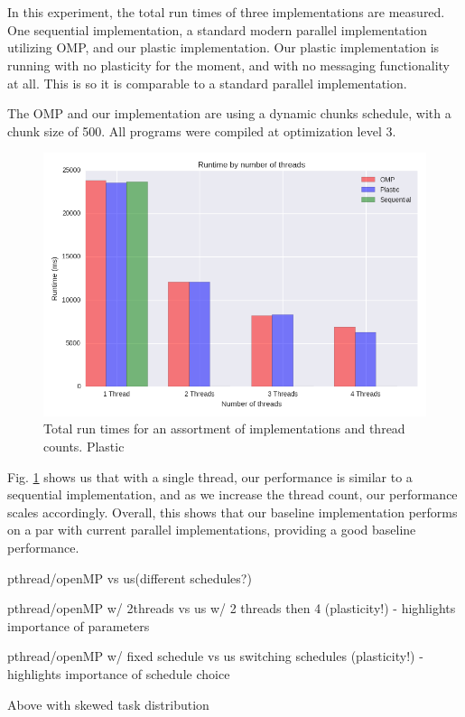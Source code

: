 \section{}

In this experiment, the total run times of three implementations are measured. One sequential implementation, a standard modern parallel implementation utilizing OMP, and our plastic implementation. Our plastic implementation is running with no plasticity for the moment, and with no messaging functionality at all. This is so it is comparable to a standard parallel implementation.

The OMP and our implementation are using a dynamic chunks schedule, with a chunk size of 500. All programs were compiled at optimization level 3.

\begin{figure}
	\includegraphics[width=1\textwidth]{graphics/runtime_by_number_of_threads.png}
	\caption{Total run times for an assortment of implementations and thread counts. Plastic }
	\label{fig:runtimes}
\end{figure}

Fig. \ref{fig:runtimes} shows us that with a single thread, our performance is similar to a sequential implementation, and as we increase the thread count, our performance scales accordingly. Overall, this shows that our baseline implementation performs on a par with current parallel implementations, providing a good baseline performance. 

pthread/openMP vs us(different schedules?)

pthread/openMP w/ 2threads vs us w/ 2 threads then 4 (plasticity!)       - highlights importance of parameters

pthread/openMP w/ fixed schedule vs us switching schedules (plasticity!) - highlights importance of schedule choice

 Above with skewed task distribution
